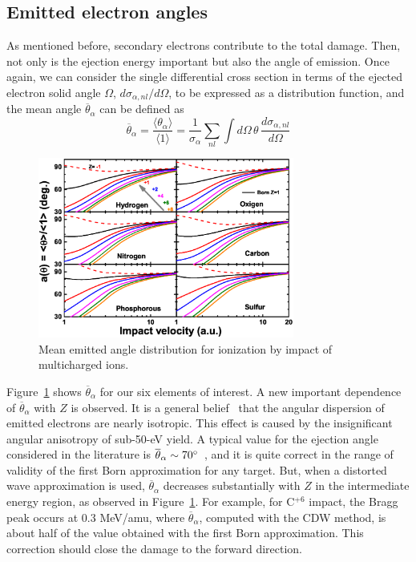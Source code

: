\documentclass[preprint,12pt]{article}
\begin{document}
\subsection{Emitted electron angles}

As mentioned before, secondary electrons contribute to the total damage. 
Then, not only is the ejection energy important but also the angle 
of emission. Once again, we can consider the single differential cross 
section in terms of the ejected electron solid angle $\Omega$, 
$d\sigma_{\alpha,nl}/d\Omega$, to be expressed as a distribution function, 
and the mean angle $\overline{\theta}_{\alpha}$ can be defined as
\begin{equation}
\overline{\theta}_{\alpha}=\frac{\langle\theta_{\alpha}\rangle}
{\langle 1\rangle}=\frac{1}{\sigma_{\alpha}}\sum\limits_{nl}
\int d\Omega\,\theta\,\frac{d\sigma_{\alpha,nl}}{d\Omega}
\end{equation}


\begin{figure}[t!]
\centering
\includegraphics[width=0.75\textwidth]{figuras/Fig_finales/Fig6.eps}
\caption{Mean emitted angle distribution for ionization by impact of
multicharged ions.}
\label{fig:emittedang}
\end{figure} 

Figure~\ref{fig:emittedang} shows $\overline{\theta}_{\alpha}$ for our six elements of 
interest. A new important dependence of $\overline{\theta}_{\alpha}$ 
with $Z$ is observed. It is a general belief~\cite{Rudd1992} that the 
angular dispersion of emitted electrons are nearly isotropic. This effect 
is caused by the insignificant angular anisotropy of sub-50-eV yield. 
A typical value for the ejection angle considered in the literature is 
$\overline{\theta}_{\alpha}\sim 70\degree$~\cite{surdutovic2018}, and 
it is quite correct in the range of validity of the first Born 
approximation for any target. But, when a distorted wave approximation 
is used, $\overline{\theta}_{\alpha}$ decreases substantially with $Z$ 
in the intermediate energy region, as observed in Figure~\ref{fig:emittedang}. 
For example, for C$^{+6}$ impact, the Bragg peak occurs at 0.3 MeV/amu, 
where $\overline{\theta}_{\alpha}$, computed with the CDW method, is 
about half of the value obtained with the first Born approximation. 
This correction should close the damage to the forward direction.
\end{document}
